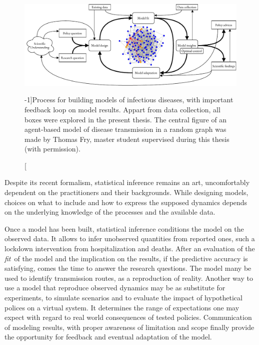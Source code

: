 \begin{figure}\centering
  \includegraphics{fig/modeling_cycle_long}
  \caption[Process for infectious disease modeling][-1\baselineskip]{Process for building models of infectious diseases, with important feedback loop on model results. Appart from data collection, all boxes were explored in the present thesis. The central figure of an agent-based model of disease transmission in a random graph was made by Thomas Fry,  master student supervised during this thesis (with permission).}\label{fig:modeling}
\end{figure}

Despite its recent formalism, statistical inference remains an art, uncomfortably dependent on the practitioners and their backgrounds. While designing models, choices on what to include and how to express the supposed dynamics depends on the underlying knowledge of the processes and the available data. 

Once a model has been built, statistical inference conditions the model on the observed data. It allows to infer unobserved quantities from reported ones, such a lockdown intervention from hospitalization and deaths. After an evaluation of the \textit{fit} of the model and the implication on the results, if the predictive accuracy is satisfying, comes the time to answer the research questions. The model many be used to identify transmission routes, as a reproduction of reality. Another way to use a model that reproduce observed dynamics may be as substitute for experiments, to simulate scenarios and to evaluate the impact of hypothetical polices on a virtual system. It determines the range of expectations one may expect with regard to real world consequences of tested policies. Communication of modeling results, with proper awareness of limitation and scope finally provide the opportunity for feedback and eventual adaptation of the model\cite{Heesterbeek:ModelingInfectiousDisease:2015}.

